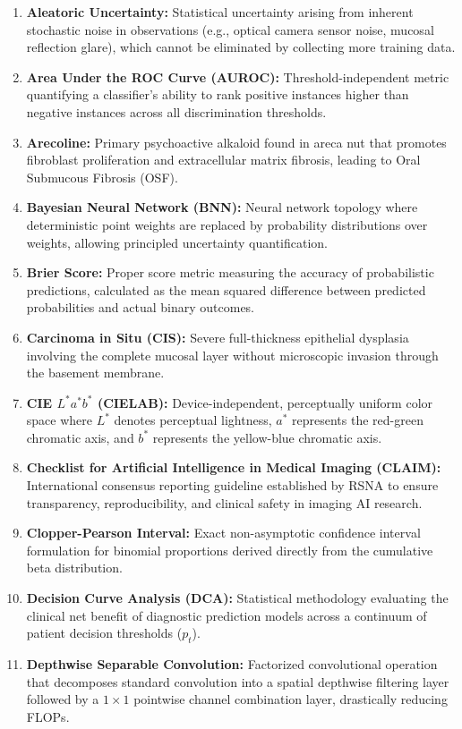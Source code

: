 \documentclass[12pt,a4paper,oneside]{report}
\begin{document}
\begin{enumerate}[label=\arabic*.]
    \item \textbf{Aleatoric Uncertainty:} Statistical uncertainty arising from inherent stochastic noise in observations (e.g., optical camera sensor noise, mucosal reflection glare), which cannot be eliminated by collecting more training data.
    \item \textbf{Area Under the ROC Curve (AUROC):} Threshold-independent metric quantifying a classifier's ability to rank positive instances higher than negative instances across all discrimination thresholds.
    \item \textbf{Arecoline:} Primary psychoactive alkaloid found in areca nut that promotes fibroblast proliferation and extracellular matrix fibrosis, leading to Oral Submucous Fibrosis (OSF).
    \item \textbf{Bayesian Neural Network (BNN):} Neural network topology where deterministic point weights are replaced by probability distributions over weights, allowing principled uncertainty quantification.
    \item \textbf{Brier Score:} Proper score metric measuring the accuracy of probabilistic predictions, calculated as the mean squared difference between predicted probabilities and actual binary outcomes.
    \item \textbf{Carcinoma in Situ (CIS):} Severe full-thickness epithelial dysplasia involving the complete mucosal layer without microscopic invasion through the basement membrane.
    \item \textbf{CIE $L^*a^*b^*$ (CIELAB):} Device-independent, perceptually uniform color space where $L^*$ denotes perceptual lightness, $a^*$ represents the red-green chromatic axis, and $b^*$ represents the yellow-blue chromatic axis.
    \item \textbf{Checklist for Artificial Intelligence in Medical Imaging (CLAIM):} International consensus reporting guideline established by RSNA to ensure transparency, reproducibility, and clinical safety in imaging AI research.
    \item \textbf{Clopper-Pearson Interval:} Exact non-asymptotic confidence interval formulation for binomial proportions derived directly from the cumulative beta distribution.
    \item \textbf{Decision Curve Analysis (DCA):} Statistical methodology evaluating the clinical net benefit of diagnostic prediction models across a continuum of patient decision thresholds ($p_t$).
    \item \textbf{Depthwise Separable Convolution:} Factorized convolutional operation that decomposes standard convolution into a spatial depthwise filtering layer followed by a $1\times 1$ pointwise channel combination layer, drastically reducing FLOPs.

\end{enumerate}
\end{document}
